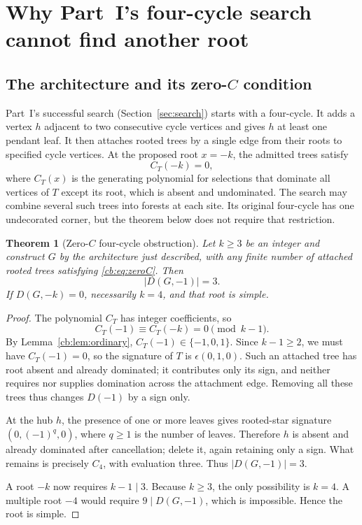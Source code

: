 \documentclass[11pt]{article}
\numberwithin{equation}{section}
\newtheorem{theorem}{Theorem}[section]
\theoremstyle{definition}
\begin{document}
\section{Why Part~I's four-cycle search cannot find another root}\label{cb:sec:obstruction}

\subsection{The architecture and its zero-\texorpdfstring{$C$}{C} condition}
Part~I's successful search (Section~\ref{sec:search}) starts with a four-cycle. It adds a
vertex $h$ adjacent to two consecutive cycle vertices and gives $h$ at
least one pendant leaf. It then attaches rooted trees by a single edge
from their roots to specified cycle vertices. At the proposed root
$x=-k$, the admitted trees satisfy
\begin{equation}\label{cb:eq:zeroC}
 C_T(-k)=0,
\end{equation}
where $C_T(x)$ is the generating polynomial for selections that dominate
all vertices of $T$ except its root, which is absent and undominated.
The search may combine several such trees into forests at each site.
Its original four-cycle has one undecorated corner, but the theorem below
does not require that restriction.

\begin{theorem}[Zero-$C$ four-cycle obstruction]\label{cb:thm:searchobstruction}
Let $k\ge3$ be an integer and construct $G$ by the architecture just
described, with any finite number of attached rooted trees satisfying
\eqref{cb:eq:zeroC}. Then
\[
 |D(G,-1)|=3.
\]
If $D(G,-k)=0$, necessarily $k=4$, and that root is simple.
\end{theorem}
\begin{proof}
The polynomial $C_T$ has integer coefficients, so
\[
 C_T(-1)\equiv C_T(-k)=0\pmod{k-1}.
\]
By Lemma~\ref{cb:lem:ordinary}, $C_T(-1)\in\{-1,0,1\}$. Since $k-1\ge2$,
we must have $C_T(-1)=0$, so the signature of $T$ is
$\epsilon(0,1,0)$. Such an attached tree has root absent and already
dominated; it contributes only its sign, and neither requires nor supplies
domination across the attachment edge. Removing all these trees thus
changes $D(-1)$ by a sign only.

At the hub $h$, the presence of one or more leaves gives rooted-star
signature $(0,(-1)^q,0)$, where $q\ge1$ is the number of leaves. Therefore
$h$ is absent and already dominated after cancellation; delete it, again
retaining only a sign. What remains is precisely $C_4$, with evaluation
three. Thus $|D(G,-1)|=3$.

A root $-k$ now requires $k-1\mid3$. Because $k\ge3$, the only possibility
is $k=4$. A multiple root $-4$ would require $9\mid D(G,-1)$, which is
impossible. Hence the root is simple.
\end{proof}
\end{document}
